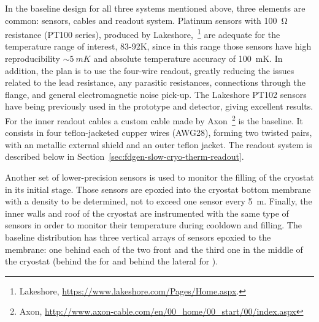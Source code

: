 In the baseline design for all three systems mentioned above, three elements are common: sensors, cables and readout system.
Platinum sensors with \SI{100}{\ohm} resistance (PT100 series), produced by Lakeshore,~\footnote{Lakeshore\texttrademark{}, \url{https://www.lakeshore.com/Pages/Home.aspx}.}
are adequate for the temperature range of interest, 83-92\si{K}, since in this range those sensors have high reproducibility 
$\sim\SI{5}{mK}$ and absolute temperature accuracy of \SI{100}{mK}.
In addition, the plan is to use the four-wire readout, greatly reducing the issues related to the lead resistance, any parasitic resistances,
connections through the flange, and general electromagnetic noise pick-up. The Lakeshore PT102 sensors
have being previously used in the  prototype and  detector,
giving excellent results. For the inner readout cables a custom cable made by Axon~\footnote{Axon\texttrademark{}, \url{http://www.axon-cable.com/en/00_home/00_start/00/index.aspx}} is the baseline. It consists in four teflon-jacketed 
cupper wires (AWG28), forming two twisted pairs, with an metallic external shield
and an outer teflon jacket.
The readout system is described below in  Section~\ref{sec:fdgen-slow-cryo-therm-readout}. %



Another set of lower-precision sensors is used to monitor the filling of the cryostat in its initial stage. Those sensors are epoxied into the cryostat bottom membrane with
a density to be determined, not to exceed one sensor every \SI{5}{m}. 
Finally, the inner walls and roof of the cryostat are instrumented with the same type of sensors in order to monitor their temperature during cooldown and filling.
The baseline distribution has three vertical arrays of sensors epoxied to the membrane: one behind each of the two %
front  and the third one in the middle of the cryostat
(behind the  for \single and behind the lateral %
 for \dual). 

